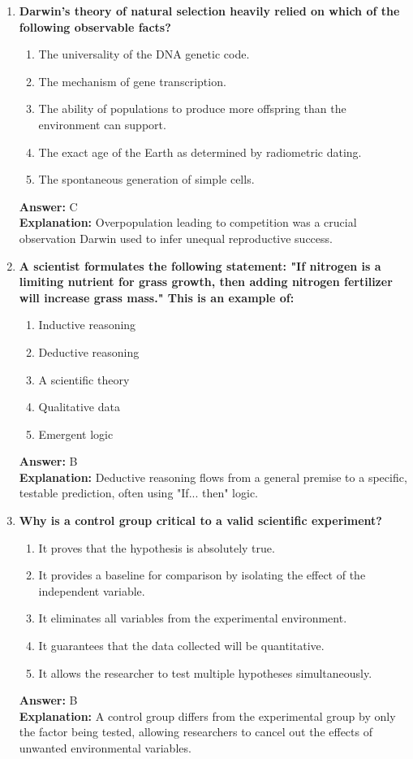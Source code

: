\documentclass[11pt, a4paper]{article}
\begin{document}
\begin{enumerate}
\item \textbf{Darwin's theory of natural selection heavily relied on which of the following observable facts?}
\begin{enumerate}[label=\Alph*.]
    \item The universality of the DNA genetic code.
    \item The mechanism of gene transcription.
    \item The ability of populations to produce more offspring than the environment can support.
    \item The exact age of the Earth as determined by radiometric dating.
    \item The spontaneous generation of simple cells.
\end{enumerate}
\textbf{Answer:} C \\
\textbf{Explanation:} Overpopulation leading to competition was a crucial observation Darwin used to infer unequal reproductive success.

\item \textbf{A scientist formulates the following statement: "If nitrogen is a limiting nutrient for grass growth, then adding nitrogen fertilizer will increase grass mass." This is an example of:}
\begin{enumerate}[label=\Alph*.]
    \item Inductive reasoning
    \item Deductive reasoning
    \item A scientific theory
    \item Qualitative data
    \item Emergent logic
\end{enumerate}
\textbf{Answer:} B \\
\textbf{Explanation:} Deductive reasoning flows from a general premise to a specific, testable prediction, often using "If... then" logic.

\item \textbf{Why is a control group critical to a valid scientific experiment?}
\begin{enumerate}[label=\Alph*.]
    \item It proves that the hypothesis is absolutely true.
    \item It provides a baseline for comparison by isolating the effect of the independent variable.
    \item It eliminates all variables from the experimental environment.
    \item It guarantees that the data collected will be quantitative.
    \item It allows the researcher to test multiple hypotheses simultaneously.
\end{enumerate}
\textbf{Answer:} B \\
\textbf{Explanation:} A control group differs from the experimental group by only the factor being tested, allowing researchers to cancel out the effects of unwanted environmental variables.


\end{enumerate}
\end{document}

